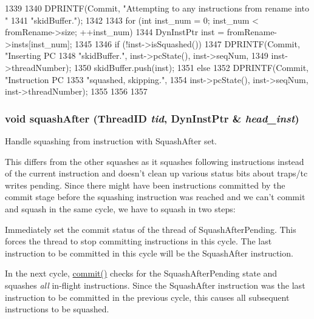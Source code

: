 \begin{DoxyCode}
1339 {
1340     DPRINTF(Commit, "Attempting to any instructions from rename into "
1341             "skidBuffer.\n");
1342 
1343     for (int inst_num = 0; inst_num < fromRename->size; ++inst_num) {
1344         DynInstPtr inst = fromRename->insts[inst_num];
1345 
1346         if (!inst->isSquashed()) {
1347             DPRINTF(Commit, "Inserting PC %
1348                     "skidBuffer.\n", inst->pcState(), inst->seqNum,
1349                     inst->threadNumber);
1350             skidBuffer.push(inst);
1351         } else {
1352             DPRINTF(Commit, "Instruction PC %
1353                     "squashed, skipping.\n",
1354                     inst->pcState(), inst->seqNum, inst->threadNumber);
1355         }
1356     }
1357 }
\end{DoxyCode}
\hypertarget{classDefaultCommit_ad47b387a7bbc4a2153b50f96b8fd2a51}{
\subsubsection[{squashAfter}]{\setlength{\rightskip}{0pt plus 5cm}void squashAfter ({\bf ThreadID} {\em tid}, \/  {\bf DynInstPtr} \& {\em head\_\-inst})}}
\label{classDefaultCommit_ad47b387a7bbc4a2153b50f96b8fd2a51}
Handle squashing from instruction with SquashAfter set.

This differs from the other squashes as it squashes following instructions instead of the current instruction and doesn't clean up various status bits about traps/tc writes pending. Since there might have been instructions committed by the commit stage before the squashing instruction was reached and we can't commit and squash in the same cycle, we have to squash in two steps:


\begin{DoxyEnumerate}
\item Immediately set the commit status of the thread of SquashAfterPending. This forces the thread to stop committing instructions in this cycle. The last instruction to be committed in this cycle will be the SquashAfter instruction. 
\item In the next cycle, \hyperlink{classDefaultCommit_ad55316f5135cdae6aa6c5a763f6c3473}{commit()} checks for the SquashAfterPending state and squashes {\itshape all\/} in-\/flight instructions. Since the SquashAfter instruction was the last instruction to be committed in the previous cycle, this causes all subsequent instructions to be squashed. 
\end{DoxyEnumerate}


